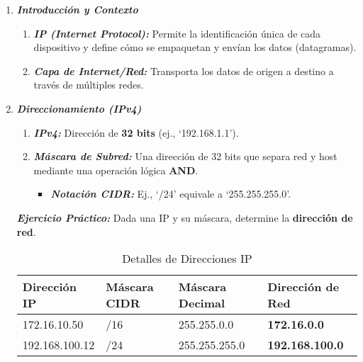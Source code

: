 \documentclass[12pt]{amsart}
\begin{document}
	\begin{enumerate}
		
		\thispagestyle{empty}
		
		\item \textbf{\textit{Introducción y Contexto }}
		
		\medskip
		\noindent
		
		\begin{enumerate}
			\item \textbf{\textit{IP (Internet Protocol):}} Permite la identificación única de cada dispositivo y define cómo se empaquetan y envían los datos (datagramas).  
			\medskip \medskip
			\item \textbf{\textit{Capa de Internet/Red:}} Transporta los datos de origen a destino a través de múltiples redes.
		\end{enumerate}
		
		\bigskip\bigskip

		\item \textbf{\textit{Direccionamiento (IPv4)}}
		
		\medskip
		\noindent
	
		\begin{enumerate}
			\item \textbf{\textit{IPv4:}} Dirección de \textbf{32 bits}  (ej., `192.168.1.1').  

			\medskip \medskip

			\item \textbf{\textit{Máscara de Subred:}} Una dirección de 32 bits que separa red y host mediante una operación lógica \textbf{AND}. 
			\medskip \medskip
			\begin{itemize}
				\item \textbf{\textit{Notación CIDR:}} Ej., `/24' equivale a `255.255.255.0'.
			\end{itemize}
		\end{enumerate}
		
		\bigskip
		\textbf{\textit{Ejercicio Práctico:}} Dada una IP y su máscara, determine la \textbf{dirección de red}.
		\medskip \medskip
			\begin{table}[h]
			    \centering
			    \begin{tabular}{|l|l|l|l|}
			        \hline
			        \textbf{Dirección IP} & \textbf{Máscara CIDR} & \textbf{Máscara Decimal} & \textbf{Dirección de Red} \\
			        \hline
			        172.16.10.50 & /16 & 255.255.0.0 & \textbf{172.16.0.0} \\
			        \hline
			        192.168.100.12 & /24 & 255.255.255.0 & \textbf{192.168.100.0} \\
			        \hline
			    \end{tabular}
			   \smallskip
			    \caption{Detalles de Direcciones IP}
			    \label{tab:detalles_direcciones_ip}
			\end{table}
		

\end{enumerate}
\end{document}
